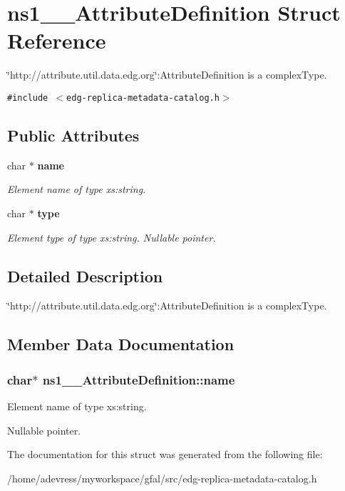 \section{ns1\_\-\_\-Attribute\-Definition Struct Reference}
\label{structns1____AttributeDefinition}
\char`\"{}http://attribute.util.data.edg.org\char`\"{}:Attribute\-Definition is a complex\-Type.  


{\tt \#include $<$edg-replica-metadata-catalog.h$>$}

\subsection*{Public Attributes}
\begin{CompactItemize}
\item 
char $\ast$ \bf{name}
\begin{CompactList}\small\item\em Element name of type xs:string. \item\end{CompactList}\item 
char $\ast$ \bf{type}\label{structns1____AttributeDefinition_3842a8b7c81b1a6318d2bd4e5f5ef54f}

\begin{CompactList}\small\item\em Element type of type xs:string. Nullable pointer. \item\end{CompactList}\end{CompactItemize}


\subsection{Detailed Description}
\char`\"{}http://attribute.util.data.edg.org\char`\"{}:Attribute\-Definition is a complex\-Type. 



\subsection{Member Data Documentation}
\subsubsection{\setlength{\rightskip}{0pt plus 5cm}char$\ast$ \bf{ns1\_\-\_\-Attribute\-Definition::name}}\label{structns1____AttributeDefinition_8c8228f233c0472df79a636b549dfb7a}


Element name of type xs:string. 

Nullable pointer. 

The documentation for this struct was generated from the following file:\begin{CompactItemize}
\item 
/home/adevress/myworkspace/gfal/src/edg-replica-metadata-catalog.h\end{CompactItemize}
